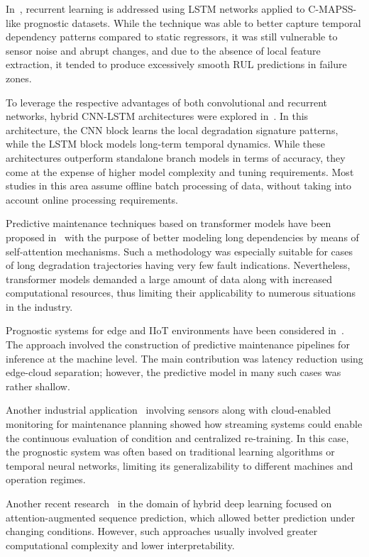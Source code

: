 \documentclass[conference]{IEEEtran}
\begin{document}
In~\cite{ref4}, recurrent learning is addressed using LSTM networks applied to C-MAPSS-like prognostic datasets. While the technique was able to better capture temporal dependency patterns compared to static regressors, it was still vulnerable to sensor noise and abrupt changes, and due to the absence of local feature extraction, it tended to produce excessively smooth RUL predictions in failure zones.

To leverage the respective advantages of both convolutional and recurrent networks, hybrid CNN-LSTM architectures were explored in~\cite{ref5}. In this architecture, the CNN block learns the local degradation signature patterns, while the LSTM block models long-term temporal dynamics. While these architectures outperform standalone branch models in terms of accuracy, they come at the expense of higher model complexity and tuning requirements. Most studies in this area assume offline batch processing of data, without taking into account online processing requirements.

Predictive maintenance techniques based on transformer models have been proposed in~\cite{ref6} with the purpose of better modeling long dependencies by means of self-attention mechanisms. Such a methodology was especially suitable for cases of long degradation trajectories having very few fault indications. Nevertheless, transformer models demanded a large amount of data along with increased computational resources, thus limiting their applicability to numerous situations in the industry.

Prognostic systems for edge and IIoT environments have been considered in~\cite{ref7}. The approach involved the construction of predictive maintenance pipelines for inference at the machine level. The main contribution was latency reduction using edge-cloud separation; however, the predictive model in many such cases was rather shallow.

Another industrial application~\cite{ref8} involving sensors along with cloud-enabled monitoring for maintenance planning showed how streaming systems could enable the continuous evaluation of condition and centralized re-training. In this case, the prognostic system was often based on traditional learning algorithms or temporal neural networks, limiting its generalizability to different machines and operation regimes.

Another recent research~\cite{ref9} in the domain of hybrid deep learning focused on attention-augmented sequence prediction, which allowed better prediction under changing conditions. However, such approaches usually involved greater computational complexity and lower interpretability.
\end{document}

